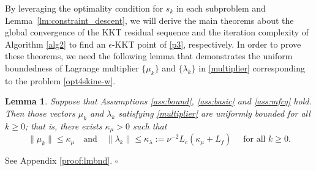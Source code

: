 \documentclass[11pt]{article}
\newenvironment{proof}{{\noindent\it Proof.}\quad}{\hfill $\square$\par}
\newtheorem{lemma}{Lemma}
\begin{document}
By leveraging the optimality condition for $s_k$ in each subproblem and Lemma~\ref{lm:constraint_descent}, we will derive the main theorems about  the global convergence of the KKT residual sequence and the iteration complexity of Algorithm \ref{alg2} to find an $\epsilon$-KKT point of \eqref{p3}, respectively. In order to  prove these theorems, we need the following lemma that demonstrates the uniform boundedness of Lagrange multiplier \(\{\mu_k\}\) and $\{\lambda_k\}$ in \eqref{multiplier} corresponding to the problem \eqref{opt4skine-w}.

\begin{lemma}\label{bnd_lam_mu}
    Suppose that  Assumptions \ref{ass:bound}, \ref{ass:basic} and \ref{ass:mfcq} hold. Then those vectors $\mu_k$ and $\lambda_k$ satisfying \eqref{multiplier} are uniformly bounded for all   $k\ge0$; that is,  there exists  $\kappa_{\mu}>0$ such that $$\|\mu_k\|\le \kappa_{\mu} \quad\mbox{and} \quad \|\lambda_k\|\le \kappa_{\lambda}:=\nu^{-2}L_c(\kappa_\mu+ L_f) \quad \mbox{ for all } k\ge 0.$$
\end{lemma}
\begin{proof}
See  Appendix \ref{proof:lmbnd}.
\end{proof}
\end{document}
